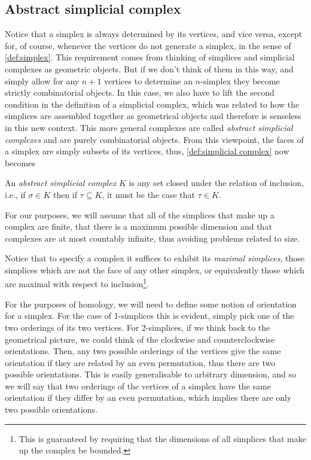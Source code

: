 \documentclass[../main.tex]{subfiles}
\begin{document}
\subsection{Abstract simplicial complex}
Notice that a simplex is always determined by its vertices, and vice versa, except for, of
course, whenever the vertices do not generate a simplex, in the sense of
\cref{def:simplex}. This requirement comes from thinking of simplices and simplicial
complexes as geometric objects. But if we don't think of them in this way, and simply
allow for any \( n+1 \) vertices to determine an \( n \)-simplex they become strictly
combinatorial objects. In this case, we also have to lift the second condition in the
definition of a simplicial complex, which was related to how the simplices are assembled
together as geometrical objects and therefore is senseless in this new context. This more
general complexes are called \emph{abstract simplicial complexes} and are purely
combinatorial objects. From this viewpoint, the faces of a simplex are simply subsets of
its vertices, thus, \cref{def:simplicial complex} now becomes
\begin{definition}
	An \emph{abstract simplicial complex} \( K \) is any set closed under the relation of
	inclusion, i.e., if \( \sigma \in K \) then if \( \tau \subseteq K \), it must be the
	case that \( \tau \in K \).  
\end{definition}
For our purposes, we will assume that all of the simplices that make up a complex are
finite, that there is a maximum possible dimension  and that complexes are at most
countably infinite, thus avoiding problems related to size. 

Notice that to specify a complex it suffices to exhibit its \emph{maximal simplices},
those simplices which are not the face of any other simplex, or equivalently those which
are maximal with respect to inclusion\footnote{This is guaranteed by requiring that the
dimensions of all simplices that make up the complex be bounded.}.

For the purposes of homology, we will need to define some notion of orientation for a
simplex. For the case of 1-simplices this is evident, simply pick one of the two orderings
of its two vertices. For 2-simplices, if we think back to the geometrical picture, we
could think of the clockwise and counterclockwise orientations. Then, any two possible
orderings of the vertices give the same orientation if they are related by an even
permutation, thus there are two possible orientations. This is easily generalisable to
arbitrary dimension, and so we will say that two orderings of the vertices of a simplex
have the same orientation if they differ by an even permutation, which implies there are
only two possible orientations.
\end{document}
